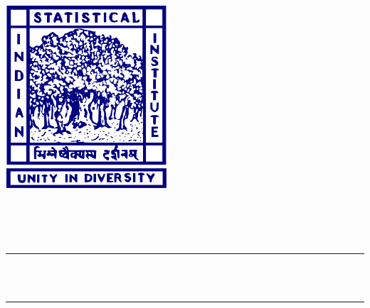\begin{titlepage}
\newcommand{\HRule}{\rule{\linewidth}{0.5mm}} %

\centering
\includegraphics[width=6cm]{title/logo.png}\\[1cm] %
 

\center %


\textsc{\LARGE \assignname}\\[1.5cm] %
\textsc{\Large \coursecode}\\[0.5cm] %
\textsc{\large \coursetitle}\\[0.5cm]  %

\makeatletter
\HRule \\[0.4cm]
{ \huge \bfseries \@title}\\[0.1cm] %
\HRule \\[1.5cm]
 



\end{titlepage}
